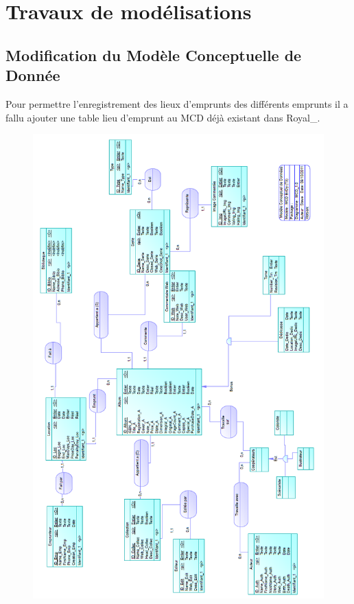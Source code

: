 \section{Travaux de modélisations} 
\subsection{Modification du Modèle Conceptuelle de Donnée}

Pour permettre l'enregistrement des lieux d'emprunts des différents emprunts il a fallu ajouter une table lieu d'emprunt au MCD déjà existant dans Royal\_.

\begin{figure}
\includegraphics[width=13.5cm]{MCD_Royal_Modif.png}
\end{figure}
\clearpage{}

